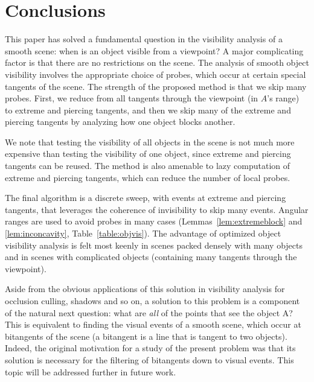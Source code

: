 \documentclass[10pt,twocolumn]{article}
\newif\ifJournal
\begin{document}
\section{Conclusions}
\label{sec:thatsitfolks}

This paper has solved a fundamental question in the visibility analysis 
of a smooth scene: when is an object visible from a viewpoint?
A major complicating factor is that there are no restrictions on the scene.
The analysis of smooth object visibility involves the appropriate choice of probes,
which occur at certain special tangents of the scene.
The strength of the proposed method is that we skip many probes.
First, we reduce from all tangents through the viewpoint (in $A$'s range) to
extreme and piercing tangents, and then we skip many of the extreme and piercing tangents
by analyzing how one object blocks another.

We note that testing the visibility of all objects in the scene is not much more expensive
than testing the visibility of one object, since extreme and piercing tangents
can be reused.
The method is also amenable to lazy computation of extreme and piercing tangents,
which can reduce the number of local probes.

The final algorithm is a discrete sweep, with events at extreme and piercing tangents,
that leverages the coherence of invisibility to skip many events.
Angular ranges are used to avoid probes in many cases 
(Lemmas~\ref{lem:extremeblock} and \ref{lem:inconcavity}, Table~\ref{table:objvis}).
The advantage of optimized object visibility analysis is felt most keenly
in scenes packed densely with many objects and in scenes with 
complicated objects (containing many tangents through the viewpoint).
\ifJournal
It is also valuable that this paper establishes that only probes at the extreme 
and piercing tangents are necessary, 
so that the above simplified algorithm is indeed possible.
\fi


Aside from the obvious applications of this solution in visibility analysis for
occlusion culling, shadows and so on, a solution to this problem is a component 
of the natural next question: what are {\em all} of the points that see the object A?
This is equivalent to finding the visual events of a smooth scene,
which occur at bitangents of the scene (a bitangent is a line that is tangent 
to two objects).
Indeed, the original motivation for a study of the present problem was
that its solution is necessary for the filtering of bitangents down to visual events.
This topic will be addressed further in future work.
\end{document}
